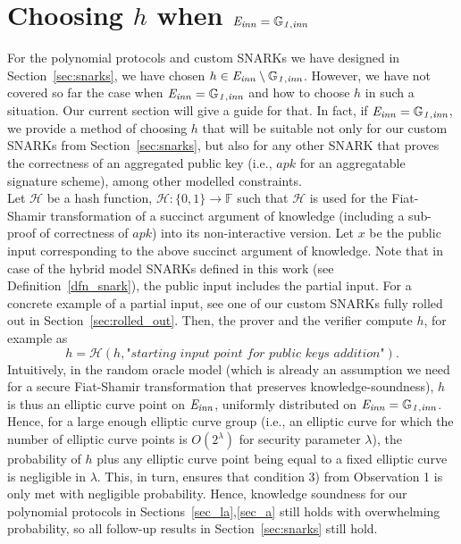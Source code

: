 \section{Choosing $h$ when $\mathit{E}_{\mathit{inn}} = \mathbb{G}_{\mathit{1,inn}}$}
\label{sec:other_choice_h}

\noindent For the polynomial protocols and custom SNARKs we have designed in Section~\ref{sec:snarks}, we have chosen 
$h \in \mathit{E}_{\mathit{inn}} \setminus \mathbb{G}_{\mathit{1,inn}}$. However, we have not covered so far the case when $\mathit{E}_{\mathit{inn}} = \mathbb{G}_{\mathit{1,inn}}$ and how to 
choose $h$ in such a situation. Our current section will give a guide for that. In fact, if $\mathit{E}_{\mathit{inn}} = \mathbb{G}_{\mathit{1,inn}}$, we provide a 
method of choosing $h$ that will be suitable not only for our custom SNARKs from Section~\ref{sec:snarks}, but also for any other SNARK that proves the 
correctness of an aggregated public key (i.e., $\mathit{apk}$ for an aggregatable signature scheme), among other modelled constraints. \\

\noindent Let $\mathcal{H}$ be a hash function, $\mathcal{H}: \{0, 1\} \rightarrow \mathbb{F}$ such that $\mathcal{H}$ is used for 
the Fiat-Shamir transformation of a succinct argument of knowledge (including a sub-proof of correctness of $\mathit{apk}$) 
into its non-interactive version. Let $x$ be the public input corresponding to the above succinct argument of knowledge. 
Note that in case of the hybrid model SNARKs defined in this work (see Definition~\ref{dfn_snark}), the public input includes the partial input. 
For a concrete example of a partial input, see one of our custom SNARKs fully rolled out in Section~\ref{sec:rolled_out}. Then, the prover and 
the verifier compute $h$, for example as $$h = \mathcal{H}(h, \textit{"starting \ input \ point \ for \ public \ keys \ addition"}).$$ Intuitively, in the 
random oracle model (which is already an assumption we need for a secure Fiat-Shamir transformation that preserves knowledge-soundness), 
$h$ is thus an elliptic curve point on $\mathit{E}_{\mathit{inn}}$, uniformly distributed on $\mathit{E}_{\mathit{inn}} = \mathbb{G}_{\mathit{1,inn}}$. Hence, for a large enough elliptic curve group (i.e., an 
elliptic curve for which the number of elliptic curve points is $O(2^{\lambda})$ for security parameter $\lambda$), the probability of $h$ plus 
any elliptic curve point being equal to a fixed elliptic curve is negligible in $\lambda$. This, in turn, ensures that condition 
3) from Observation 1
 is only met with negligible probability. Hence, knowledge soundness 
for our polynomial protocols in Sections~\ref{sec_la},\ref{sec_a} still holds with overwhelming probability, so all follow-up results in 
Section~\ref{sec:snarks} still hold.
